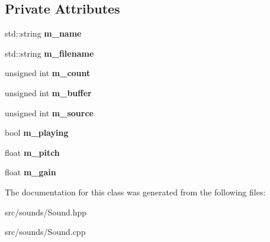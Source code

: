 \subsection*{Private Attributes}
\begin{DoxyCompactItemize}
\item 
\mbox{\label{class_flounder_1_1_sound_aa3e86e4ae33d6c6bf997f49e26aafc02}} 
std\+::string {\bfseries m\+\_\+name}
\item 
\mbox{\label{class_flounder_1_1_sound_ae3f3356e25e04372bd747e980b8279c5}} 
std\+::string {\bfseries m\+\_\+filename}
\item 
\mbox{\label{class_flounder_1_1_sound_a0aa0e63248cd5a04be3b309af7d56021}} 
unsigned int {\bfseries m\+\_\+count}
\item 
\mbox{\label{class_flounder_1_1_sound_a5f6177f7e6a9737ae5fab8e5e4a3164a}} 
unsigned int {\bfseries m\+\_\+buffer}
\item 
\mbox{\label{class_flounder_1_1_sound_a67c6355320650cde074aa25d4b31b048}} 
unsigned int {\bfseries m\+\_\+source}
\item 
\mbox{\label{class_flounder_1_1_sound_a8711ed33dae97e4a8afe44ff9ccd470e}} 
bool {\bfseries m\+\_\+playing}
\item 
\mbox{\label{class_flounder_1_1_sound_a11f606db7425cc2aef07aa1109a05f88}} 
float {\bfseries m\+\_\+pitch}
\item 
\mbox{\label{class_flounder_1_1_sound_ad1562d363772d201751e5bba62c8f007}} 
float {\bfseries m\+\_\+gain}
\end{DoxyCompactItemize}


The documentation for this class was generated from the following files\+:\begin{DoxyCompactItemize}
\item 
src/sounds/Sound.\+hpp\item 
src/sounds/Sound.\+cpp\end{DoxyCompactItemize}
